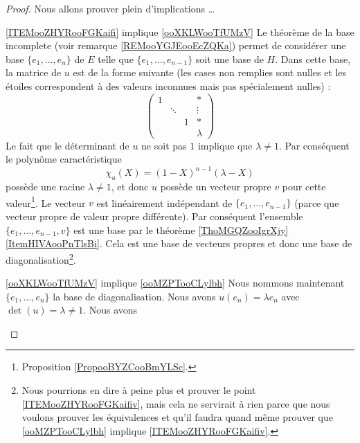 \begin{proof}
    Nous allons prouver plein d'implications \ldots
    \begin{subproof}
    \item[\ref{ITEMooZHYRooFGKaifi} implique \ref{ooXKLWooTfUMzV}]
        Le théorème de la base incomplete (voir remarque \ref{REMooYGJEooEcZQKa}) permet de considérer une base \( \{ e_1,\ldots, e_n \}\) de \( E\) telle que \( \{ e_1,\ldots, e_{n-1} \} \) soit une base de \( H\). Dans cette base, la matrice de \( u\) est de la forme suivante (les cases non remplies sont nulles et les étoiles correspondent à des valeurs inconnues mais pas spécialement nulles) :
        \begin{equation}        \label{EqooPQOEooGUyIwa}
        \begin{pmatrix}
             1   &       &       &   *    \\
                &   \ddots    &       &   \vdots    \\
                &       &   1    &   *    \\ 
                &       &       &   \lambda     
         \end{pmatrix}
        \end{equation}
        Le fait que le déterminant de \( u\) ne soit pas \( 1\) implique que \( \lambda\neq 1\). Par conséquent le polynôme caractéristique
        \begin{equation}
            \chi_u(X)=(1-X)^{n-1}(\lambda-X)
        \end{equation}
        possède une racine \( \lambda\neq 1\), et donc \( u\) possède un vecteur propre \( v\) pour cette valeur\footnote{Proposition \ref{PropooBYZCooBmYLSc}.}. Le vecteur \( v\) est linéairement indépendant de \( \{ e_1,\ldots, e_{n-1} \}\) (parce que vecteur propre de valeur propre différente). Par conséquent l'ensemble \( \{ e_1,\ldots, e_{n-1},v \}\) est une base par le théorème \ref{ThoMGQZooIgrXjy}\ref{ItemHIVAooPnTlsBi}. Cela est une base de vecteurs propres et donc une base de diagonalisation\footnote{Nous pourrions en dire à peine plus et prouver le point \ref{ITEMooZHYRooFGKaifiv}, mais cela ne servirait à rien parce que nous voulons prouver les équivalences et qu'il faudra quand même prouver que \ref{ooMZPTooCLylbh} implique \ref{ITEMooZHYRooFGKaifiv}.}.
    \item[\ref{ooXKLWooTfUMzV} implique \ref{ooMZPTooCLylbh}]
        Nous nommons maintenant \( \{ e_1,\ldots, e_{n} \}\) la base de diagonalisation. Nous avons \( u(e_n)=\lambda e_n\) avec \( \det(u)=\lambda\neq 1\). Nous avons

\end{subproof}
\end{proof}
